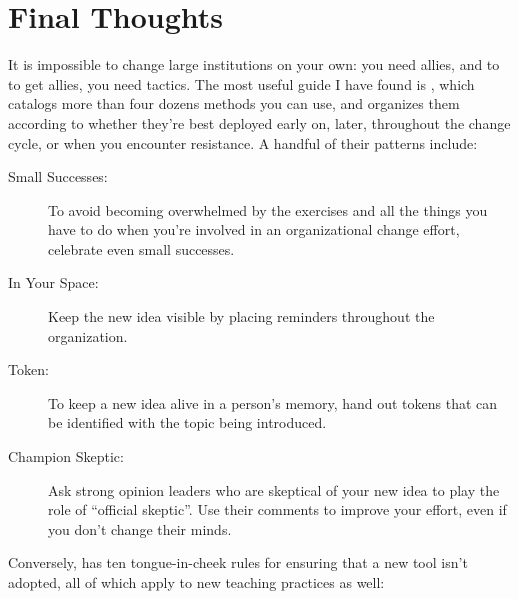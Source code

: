 \section{Final Thoughts}\label{s:partner-final}

It is impossible to change large institutions on your own: you need
allies, and to to get allies, you need tactics.  The most useful guide
I have found is \cite{Mann2015}, which catalogs more than four dozens
methods you can use, and organizes them according to whether they're
best deployed early on, later, throughout the change cycle, or when
you encounter resistance.  A handful of their patterns include:

\begin{description}

\item[Small Successes:] To avoid becoming overwhelmed by the
  exercises and all the things you have to do when you're involved in
  an organizational change effort, celebrate even small successes.

\item[In Your Space:] Keep the new idea visible by placing reminders
  throughout the organization.

\item[Token:] To keep a new idea alive in a person's memory, hand out
  tokens that can be identified with the topic being introduced.

\item[Champion Skeptic:] Ask strong opinion leaders who are skeptical
  of your new idea to play the role of ``official skeptic''.  Use
  their comments to improve your effort, even if you don't change
  their minds.
  
\end{description}

Conversely, \cite{Farm2006} has ten tongue-in-cheek rules for ensuring
that a new tool isn't adopted, all of which apply to new teaching
practices as well:

